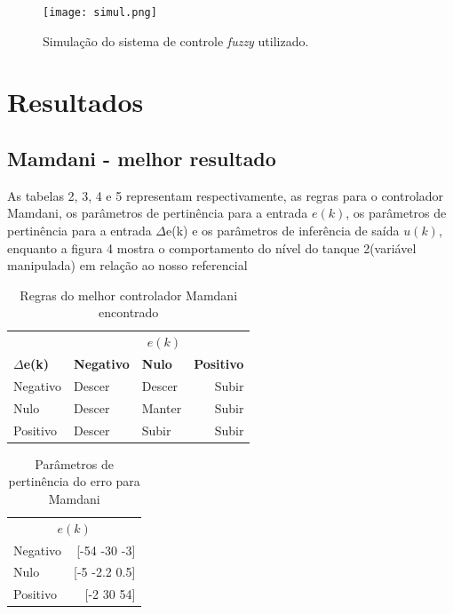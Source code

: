 \documentclass[conference]{IEEEtran}
\begin{document}
\begin{figure}[!ht]
    \centering
    \texttt{[image: simul.png]}
    \caption { Simulação do sistema de controle \textit{fuzzy} utilizado. }
\end{figure}

\section{Resultados}

\subsection{Mamdani - melhor resultado}

As tabelas 2, 3, 4  e 5 representam respectivamente, as regras para o controlador Mamdani, os parâmetros de pertinência para a entrada $e(k)$, os parâmetros de pertinência  para a entrada $\Delta$e(k) e os parâmetros de inferência de saída $u(k)$, enquanto a figura 4 mostra o comportamento do nível do tanque 2(variável manipulada) em relação ao nosso referencial

\begin{table}[!ht]
\caption{Regras do melhor controlador Mamdani encontrado}
\centering
\begin{tabular}{lllr}
\toprule
\multicolumn{3}{r}{\textbf{$e(k)$}} \\
\cmidrule(r){2-4}
\textbf{$\Delta$e(k)} & \textbf{Negativo} & \textbf{Nulo} & \textbf{Positivo} \\
Negativo & Descer & Descer & Subir \\
Nulo & Descer & Manter & Subir \\
Positivo & Descer & Subir & Subir \\
\bottomrule
\end{tabular}
\end{table}

\begin{table}[!ht]
\caption{Parâmetros de pertinência do erro para Mamdani}
\centering
\begin{tabular}{lr}
\toprule
\multicolumn{2}{c}{$e(k)$} \\
\cmidrule(r){1-2}
Negativo & [-54 -30 -3] \\
Nulo & [-5 -2.2 0.5] \\
Positivo & [-2 30 54] \\
\bottomrule
\end{tabular}
\end{table}
\end{document}
